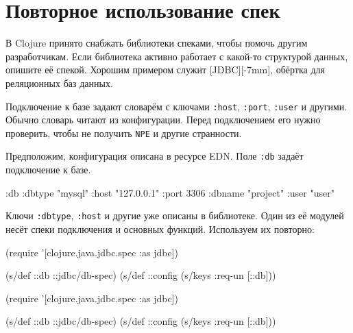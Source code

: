 \section{Повторное использование спек}


В Clojure принято снабжать библиотеки спеками, чтобы помочь другим
разработчикам. Если библиотека активно работает с какой-то структурой данных,
опишите её спекой. Хорошим примером служит
[JDBC][-7mm], обёртка для реляционных
баз данных.

Подключение к базе задают словарём с ключами \verb|:host|, \verb|:port|,
\verb|:user| и другими. Обычно словарь читают из конфигурации. Перед
подключением его нужно проверить, чтобы не получить \verb|NPE| и другие
странности.


Предположим, конфигурация описана в ресурсе EDN. Поле \verb|:db| задаёт
подключение к базе.


\begin{english}
  \begin{clojure}
{:db {:dbtype "mysql"
      :host "127.0.0.1"
      :port 3306
      :dbname "project"
      :user "user"}}
  \end{clojure}
\end{english}

Ключи \verb|:dbtype|, \verb|:host| и другие уже описаны в библиотеке. Один из её
модулей несёт спеки подключения и основных функций. Используем их повторно:

\ifx\DEVICETYPE\MOBILE

\begin{english}
  \begin{clojure}
(require
  '[clojure.java.jdbc.spec :as jdbc])

(s/def ::db ::jdbc/db-spec)
(s/def ::config (s/keys :req-un [::db]))
  \end{clojure}
\end{english}

\else

\begin{english}
  \begin{clojure}
(require '[clojure.java.jdbc.spec :as jdbc])

(s/def ::db ::jdbc/db-spec)
(s/def ::config (s/keys :req-un [::db]))
  \end{clojure}
\end{english}

